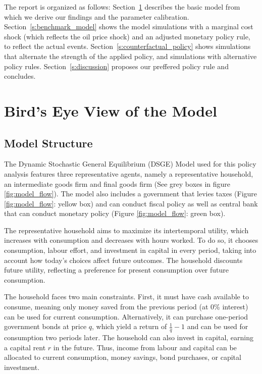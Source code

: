 \documentclass[12pt]{article}
\begin{document}
The report is organized as follows: Section~\ref{s:model_description} describes the basic model from which we derive our findings and the parameter calibration. Section~\ref{s:benchmark_model} shows the model simulations with a marginal cost shock (which reflects the oil price shock) and an adjusted monetary policy rule, to reflect the actual events. Section~\ref{s:counterfactual_policy} shows simulations that alternate the strength of the applied policy, and simulations with alternative policy rules. Section~\ref{s:discussion} proposes our preffered policy rule and concludes. 

\newpage
\section{Bird’s Eye View of the Model}\label{s:model_description}


\subsection*{Model Structure}
The Dynamic Stochastic General Equilibrium (DSGE) Model used for this policy analysis features
three representative agents, namely a representative household, an intermediate goods firm and final goods firm (See grey boxes in figure \ref{fig:model_flow}). The model also includes a government that levies taxes (Figure \ref{fig:model_flow}: yellow box) and can conduct fiscal policy as well as central bank that can conduct monetary policy (Figure \ref{fig:model_flow}: green box).

The representative household aims to maximize its intertemporal utility, which increases with consumption and decreases with hours worked. To do so, it chooses consumption, labour effort, and investment in capital in every period, taking into account how today's choices affect future outcomes. The household discounts future utility, reflecting a preference for present consumption over future consumption.

The household faces two main constraints. First, it must have cash available to consume, meaning only money saved from the previous period (at 0\% interest) can be used for current consumption. Alternatively, it can purchase one-period government bonds at price $q$, which yield a return of $\frac{1}{q} - 1$ and can be used for consumption two periods later. The household can also invest in capital, earning a capital rent $r$ in the future. Thus, income from labour and capital can be allocated to current consumption, money savings, bond purchases, or capital investment.
\end{document}
